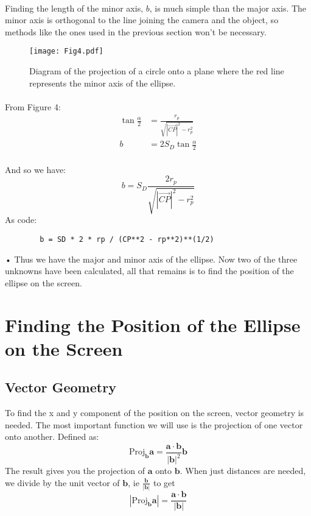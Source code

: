 \documentclass{article}
\newcommand\cpv{\overrightarrow{CP}\xspace}
\begin{document}
	\paragraph{}	
	Finding the length of the minor axis, $b$, is much simple than the major axis. The minor axis is orthogonal to the line joining the camera 
	and the object, so methods like the ones used in the previous section won't be necessary. 
	\begin{figure}[H]
		\texttt{[image: Fig4.pdf]}
		\caption{Diagram of the projection of a circle onto a plane where the red line represents the minor axis of the ellipse.}	
	\end{figure}
	\paragraph{}
	From Figure 4:
	\begin{align*}
		\tan{\frac{\alpha}{2}} & = \frac{r_p}{\sqrt{\left|\cpv\right|^2 - r_p^2}} \\
		b & = 2 S_D \tan{\frac{\alpha}{2}}
	\end{align*}
	\paragraph{}
	And so we have:
	\begin{equation}
		b = S_D \frac{2 r_p}{\sqrt{\left|\cpv\right|^2 - r_p^2}}
	\end{equation}
	As code:
	\begin{verbatim}
		b = SD * 2 * rp / (CP**2 - rp**2)**(1/2)
	\end{verbatim}•
	Thus we have the major and minor axis of the ellipse. Now two of the three unknowns have been calculated, all that remains is to find the 	position of the ellipse on the screen.
	
\section{Finding the Position of the Ellipse on the Screen}
	\subsection{Vector Geometry}
	To find the x and y component of the position on the screen, vector geometry is needed. The most important function we will use is the 
	projection of one vector onto another. Defined as:
	$$ \text{Proj}_{\mathbf{b}}\mathbf{a} = \frac{\mathbf{a} \cdot \mathbf{b}}{|\mathbf{b}|^2} \mathbf{b} $$
	The result gives you the projection of $\mathbf{a}$ onto $\mathbf{b}$. When just distances are needed, we divide 
	by the unit vector of $\mathbf{b}$, ie $\frac{\mathbf{b}}{|\mathbf{b}|}$ to get
	$$ \left|\text{Proj}_\mathbf{b} \mathbf{a}\right| = \frac{\mathbf{a} \cdot \mathbf{b}}{|\mathbf{b}|} $$ 
\end{document}

